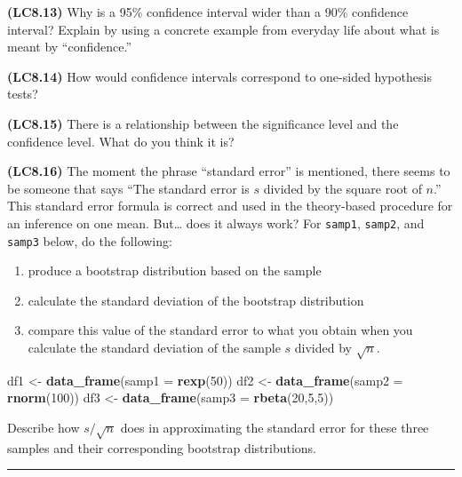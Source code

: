 \documentclass[]{tufte-book}
\newenvironment{Shaded}{\begin{snugshade}}{\end{snugshade}}
\newcommand{\KeywordTok}[1]{\textcolor[rgb]{0.13,0.29,0.53}{\textbf{{#1}}}}
\newcommand{\DataTypeTok}[1]{\textcolor[rgb]{0.13,0.29,0.53}{{#1}}}
\newcommand{\DecValTok}[1]{\textcolor[rgb]{0.00,0.00,0.81}{{#1}}}
\newcommand{\StringTok}[1]{\textcolor[rgb]{0.31,0.60,0.02}{{#1}}}
\newcommand{\NormalTok}[1]{{#1}}
\let\oldrule=\rule
\renewcommand{\rule}[1]{\oldrule{\linewidth}}
\providecommand{\tightlist}{%
  \setlength{\itemsep}{0pt}\setlength{\parskip}{0pt}}
\begin{document}
\textbf{(LC8.13)} Why is a 95\% confidence interval wider than a 90\%
confidence interval? Explain by using a concrete example from everyday
life about what is meant by ``confidence.''

\textbf{(LC8.14)} How would confidence intervals correspond to one-sided
hypothesis tests?

\textbf{(LC8.15)} There is a relationship between the significance level
and the confidence level. What do you think it is?

\textbf{(LC8.16)} The moment the phrase ``standard error'' is mentioned,
there seems to be someone that says ``The standard error is \(s\)
divided by the square root of \(n\).'' This standard error formula is
correct and used in the theory-based procedure for an inference on one
mean. But\ldots{} does it always work? For \texttt{samp1},
\texttt{samp2}, and \texttt{samp3} below, do the following:

\begin{enumerate}
\def\labelenumi{\arabic{enumi}.}
\tightlist
\item
  produce a bootstrap distribution based on the sample
\item
  calculate the standard deviation of the bootstrap distribution
\item
  compare this value of the standard error to what you obtain when you
  calculate the standard deviation of the sample \(s\) divided by
  \(\sqrt{n}\).
\end{enumerate}

\begin{Shaded}
\begin{Highlighting}[]
\NormalTok{df1 <-}\StringTok{ }\KeywordTok{data_frame}\NormalTok{(}\DataTypeTok{samp1 =} \KeywordTok{rexp}\NormalTok{(}\DecValTok{50}\NormalTok{))}
\NormalTok{df2 <-}\StringTok{ }\KeywordTok{data_frame}\NormalTok{(}\DataTypeTok{samp2 =} \KeywordTok{rnorm}\NormalTok{(}\DecValTok{100}\NormalTok{))}
\NormalTok{df3 <-}\StringTok{ }\KeywordTok{data_frame}\NormalTok{(}\DataTypeTok{samp3 =} \KeywordTok{rbeta}\NormalTok{(}\DecValTok{20}\NormalTok{,}\DecValTok{5}\NormalTok{,}\DecValTok{5}\NormalTok{))}
\end{Highlighting}
\end{Shaded}

Describe how \(s / \sqrt{n}\) does in approximating the standard error
for these three samples and their corresponding bootstrap distributions.

\begin{center}\rule{0.5\linewidth}{\linethickness}\end{center}
\end{document}
